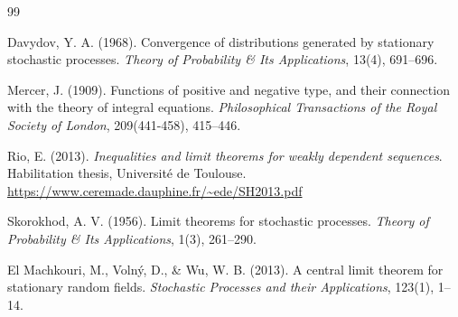 \documentclass[final,3p,twocolumn,times,authoryear]{elsarticle}
\theoremstyle{definition}
\begin{document}
\begin{thebibliography}{99}

Davydov, Y. A. (1968).
Convergence of distributions generated by stationary stochastic processes.
\textit{Theory of Probability \& Its Applications}, 13(4), 691--696.

Mercer, J. (1909).
Functions of positive and negative type, and their connection with the theory of integral equations.
\textit{Philosophical Transactions of the Royal Society of London}, 209(441-458), 415--446.

Rio, E. (2013).
\textit{Inequalities and limit theorems for weakly dependent sequences}.
Habilitation thesis, Universit\'{e} de Toulouse.\\
\url{https://www.ceremade.dauphine.fr/~ede/SH2013.pdf}

Skorokhod, A. V. (1956).
Limit theorems for stochastic processes.
\textit{Theory of Probability \& Its Applications}, 1(3), 261--290.

El Machkouri, M., Voln\'{y}, D., \& Wu, W. B. (2013).
A central limit theorem for stationary random fields.
\textit{Stochastic Processes and their Applications}, 123(1), 1--14.

\end{thebibliography}
\end{document}
